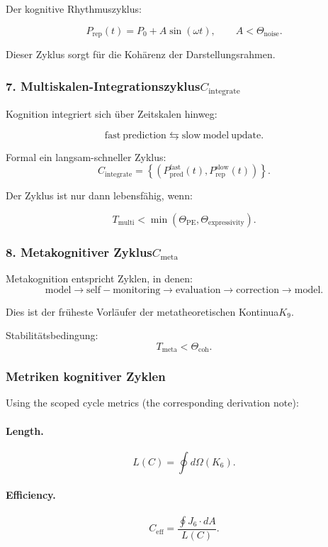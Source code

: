 Der kognitive Rhythmuszyklus:

\[
 P_{\mathrm{rep}}(t) = P_0 + A\sin(\omega t),\qquad
 A < \Theta_{\mathrm{noise}}.
\]

Dieser Zyklus sorgt für die Kohärenz der Darstellungsrahmen.

\subsubsection{7. Multiskalen-Integrationszyklus$C_{\mathrm{integrate}}$}

Kognition integriert sich über Zeitskalen hinweg:

\[
 \mathrm{fast\ prediction}
 \leftrightarrows
 \mathrm{slow\ model\ update}.
\]

Formal ein langsam-schneller Zyklus:
\[
 C_{\mathrm{integrate}} =
 \left\{
   (P_{\mathrm{pred}}^{\mathrm{fast}}(t),
    P_{\mathrm{rep}}^{\mathrm{slow}}(t))
 \right\}.
\]

Der Zyklus ist nur dann lebensfähig, wenn:

\[
 T_{\mathrm{multi}} < \min(\Theta_{\mathrm{PE}},\Theta_{\mathrm{expressivity}}).
\]

\subsubsection{8. Metakognitiver Zyklus$C_{\mathrm{meta}}$}

Metakognition entspricht Zyklen, in denen:
\[
 \mathrm{model}
 \to
 \mathrm{self-monitoring}
 \to
 \mathrm{evaluation}
 \to
 \mathrm{correction}
 \to
 \mathrm{model}.
\]

Dies ist der früheste Vorläufer der metatheoretischen Kontinua$K_9$.

Stabilitätsbedingung:
\[
 T_{\mathrm{meta}} < \Theta_{\mathrm{coh}}.
\]

\subsubsection{Metriken kognitiver Zyklen}

Using the scoped cycle metrics (the corresponding derivation note):

\paragraph{Length.}
\[
  L(C)=\oint d\Omega(K_6).
\]

\paragraph{Efficiency.}
\[
  C_{\mathrm{eff}}
    = \frac{\oint J_6\cdot dA}{L(C)}.
\]

